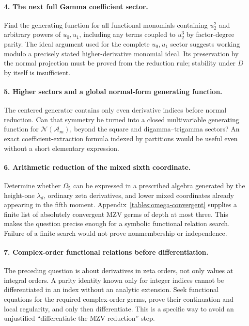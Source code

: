 \documentclass[11pt,a4paper]{article}
\numberwithin{equation}{section}
\theoremstyle{definition}
\theoremstyle{remark}
\newcommand{\A}{\mathcal A}
\newcommand{\NN}{\mathcal N}
\begin{document}
\paragraph{4. The next full Gamma coefficient sector.}
Find the generating function for all functional monomials containing
$u_2^2$ and arbitrary powers of $u_0,u_1$, including any terms
coupled to $u_2^3$ by factor-degree parity.
The ideal argument used for the complete $u_0,u_1$ sector suggests
working modulo a precisely stated higher-derivative monomial ideal.
Its preservation by the normal projection must be proved from the
reduction rule; stability under $D$ by itself is insufficient.

\paragraph{5. Higher sectors and a global normal-form generating function.}
The centered generator contains only even derivative indices before
normal reduction.  Can that symmetry be turned into a closed
multivariable generating function for $\NN(\A_m)$, beyond the
square and digamma--trigamma sectors?  An exact coefficient-extraction
formula indexed by partitions would be useful even without a short
elementary expression.

\paragraph{6. Arithmetic reduction of the mixed sixth coordinate.}
Determine whether $\Omega_5$ can be expressed in a prescribed
algebra generated by the height-one $\lambda_d$, ordinary zeta
derivatives, and lower mixed coordinates already appearing in the
fifth moment.  Appendix~\ref{tables:omega-convergent} supplies a
finite list of absolutely convergent MZV germs of depth at most three.
This makes the question precise enough for a symbolic functional
relation search.  Failure of a finite search would not prove
nonmembership or independence.

\paragraph{7. Complex-order functional relations before differentiation.}
The preceding question is about derivatives in zeta orders, not only
values at integral orders.  A parity identity known only for integer
indices cannot be differentiated in an index without an analytic
extension.  Seek functional equations for the required complex-order
germs, prove their continuation and local regularity, and only then
differentiate.  This is a specific way to avoid an unjustified
``differentiate the MZV reduction'' step.
\end{document}
